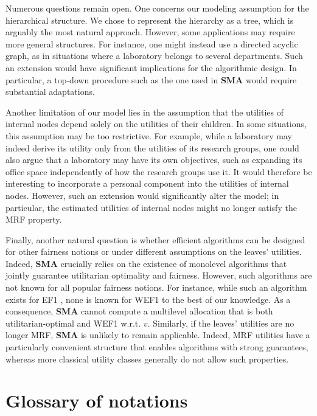 \documentclass[]{article}
\begin{document}
Numerous questions remain open. One concerns our modeling assumption for the hierarchical structure. We chose to represent the hierarchy as a tree, which is arguably the most natural approach. However, some applications may require more general structures. For instance, one might instead use a directed acyclic graph, as in situations where a laboratory belongs to several departments. Such an extension would have significant implications for the algorithmic design. In particular, a top-down procedure such as the one used in \textbf{SMA} would require substantial adaptations.

Another limitation of our model lies in the assumption that the utilities of internal nodes depend solely on the utilities of their children. In some situations, this assumption may be too restrictive. For example, while a laboratory may indeed derive its utility only from the utilities of its research groups, one could also argue that a laboratory may have its own objectives, such as expanding its office space independently of how the research groups use it. It would therefore be interesting to incorporate a personal component into the utilities of internal nodes. However, such an extension would significantly alter the model; in particular, the estimated utilities of internal nodes might no longer satisfy the MRF property.

Finally, another natural question is whether efficient algorithms can be designed for other fairness notions or under different assumptions on the leaves’ utilities. Indeed, \textbf{SMA} crucially relies on the existence of monolevel algorithms that jointly guarantee utilitarian optimality and fairness. However, such algorithms are not known for all popular fairness notions. For instance, while such an algorithm exists for EF1 \cite{Benabbou_et_al2021}, none is known for WEF1 to the best of our knowledge. As a consequence, \textbf{SMA} cannot compute a multilevel allocation that is both utilitarian-optimal and WEF1 w.r.t. $v$. Similarly, if the leaves’ utilities are no longer MRF, \textbf{SMA} is unlikely to remain applicable. Indeed, MRF utilities have a particularly convenient structure that enables algorithms with strong guarantees, whereas more classical utility classes generally do not allow such properties.




\appendix

\section{Glossary of notations} \label{appendix: glossary notations}
\end{document}
